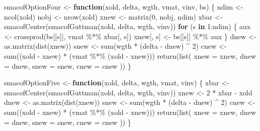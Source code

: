 \documentclass[
  12pt,
  letterpaper,
  DIV=11,
  numbers=noendperiod]{scrartcl}
\newenvironment{Shaded}{\begin{snugshade}}{\end{snugshade}}
\newcommand{\AttributeTok}[1]{\textcolor[rgb]{0.40,0.45,0.13}{#1}}
\newcommand{\ControlFlowTok}[1]{\textcolor[rgb]{0.00,0.23,0.31}{\textbf{#1}}}
\newcommand{\DecValTok}[1]{\textcolor[rgb]{0.68,0.00,0.00}{#1}}
\newcommand{\FunctionTok}[1]{\textcolor[rgb]{0.28,0.35,0.67}{#1}}
\newcommand{\NormalTok}[1]{\textcolor[rgb]{0.00,0.23,0.31}{#1}}
\newcommand{\OtherTok}[1]{\textcolor[rgb]{0.00,0.23,0.31}{#1}}
\newcommand{\SpecialCharTok}[1]{\textcolor[rgb]{0.37,0.37,0.37}{#1}}
\begin{document}
\begin{Shaded}
\begin{Highlighting}[]
\NormalTok{smacofOptionFour }\OtherTok{\textless{}{-}} \ControlFlowTok{function}\NormalTok{(xold, delta, wgth, vmat, vinv, bs) \{}
\NormalTok{  ndim }\OtherTok{\textless{}{-}} \FunctionTok{ncol}\NormalTok{(xold)}
\NormalTok{  nobj }\OtherTok{\textless{}{-}} \FunctionTok{nrow}\NormalTok{(xold)}
\NormalTok{  xnew }\OtherTok{\textless{}{-}} \FunctionTok{matrix}\NormalTok{(}\DecValTok{0}\NormalTok{, nobj, ndim)}
\NormalTok{  xbar }\OtherTok{\textless{}{-}} \FunctionTok{smacofCenter}\NormalTok{(}\FunctionTok{smacofGuttman}\NormalTok{(xold, delta, wgth, vinv))}
  \ControlFlowTok{for}\NormalTok{ (s }\ControlFlowTok{in} \DecValTok{1}\SpecialCharTok{:}\NormalTok{ndim) \{}
\NormalTok{    aux }\OtherTok{\textless{}{-}} \FunctionTok{crossprod}\NormalTok{(bs[[s]], vmat }\SpecialCharTok{\%*\%}\NormalTok{ xbar[, s])}
\NormalTok{    xnew[, s] }\OtherTok{\textless{}{-}}\NormalTok{ bs[[s]] }\SpecialCharTok{\%*\%}\NormalTok{ aux}
\NormalTok{  \}}
\NormalTok{  dnew }\OtherTok{\textless{}{-}} \FunctionTok{as.matrix}\NormalTok{(}\FunctionTok{dist}\NormalTok{(xnew))}
\NormalTok{  snew }\OtherTok{\textless{}{-}} \FunctionTok{sum}\NormalTok{(wgth }\SpecialCharTok{*}\NormalTok{ (delta }\SpecialCharTok{{-}}\NormalTok{ dnew) }\SpecialCharTok{\^{}} \DecValTok{2}\NormalTok{)}
\NormalTok{  cnew }\OtherTok{\textless{}{-}} \FunctionTok{sum}\NormalTok{((xold }\SpecialCharTok{{-}}\NormalTok{ xnew) }\SpecialCharTok{*}\NormalTok{ (vmat }\SpecialCharTok{\%*\%}\NormalTok{ (xold }\SpecialCharTok{{-}}\NormalTok{ xnew)))}
  \FunctionTok{return}\NormalTok{(}\FunctionTok{list}\NormalTok{(}
    \AttributeTok{xnew =}\NormalTok{ xnew,}
    \AttributeTok{dnew =}\NormalTok{ dnew,}
    \AttributeTok{snew =}\NormalTok{ snew,}
    \AttributeTok{cnew =}\NormalTok{ cnew}
\NormalTok{  ))}
\NormalTok{\}}


\NormalTok{smacofOptionFive }\OtherTok{\textless{}{-}} \ControlFlowTok{function}\NormalTok{(xold, delta, wgth, vmat, vinv) \{}
\NormalTok{  xbar }\OtherTok{\textless{}{-}} \FunctionTok{smacofCenter}\NormalTok{(}\FunctionTok{smacofGuttman}\NormalTok{(xold, delta, wgth, vinv))}
\NormalTok{  xnew }\OtherTok{\textless{}{-}} \DecValTok{2} \SpecialCharTok{*}\NormalTok{ xbar }\SpecialCharTok{{-}}\NormalTok{ xold}
\NormalTok{  dnew }\OtherTok{\textless{}{-}} \FunctionTok{as.matrix}\NormalTok{(}\FunctionTok{dist}\NormalTok{(xnew))}
\NormalTok{  snew }\OtherTok{\textless{}{-}} \FunctionTok{sum}\NormalTok{(wgth }\SpecialCharTok{*}\NormalTok{ (delta }\SpecialCharTok{{-}}\NormalTok{ dnew) }\SpecialCharTok{\^{}} \DecValTok{2}\NormalTok{)}
\NormalTok{  cnew }\OtherTok{\textless{}{-}} \FunctionTok{sum}\NormalTok{((xold }\SpecialCharTok{{-}}\NormalTok{ xnew) }\SpecialCharTok{*}\NormalTok{ (vmat }\SpecialCharTok{\%*\%}\NormalTok{ (xold }\SpecialCharTok{{-}}\NormalTok{ xnew)))}
  \FunctionTok{return}\NormalTok{(}\FunctionTok{list}\NormalTok{(}
    \AttributeTok{xnew =}\NormalTok{ xnew,}
    \AttributeTok{dnew =}\NormalTok{ dnew,}
    \AttributeTok{snew =}\NormalTok{ snew,}
    \AttributeTok{cnew =}\NormalTok{ cnew}
\NormalTok{  ))}
\NormalTok{\}}


\end{Highlighting}
\end{Shaded}
\end{document}
